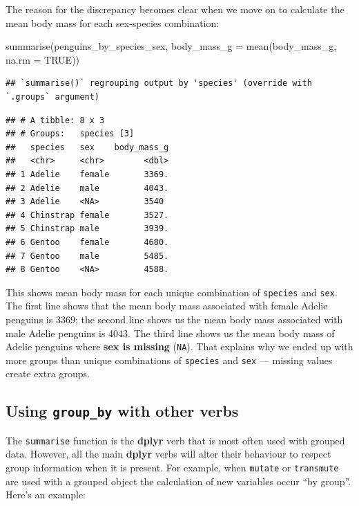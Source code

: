 \documentclass[
]{book}
\newenvironment{Shaded}{\begin{snugshade}}{\end{snugshade}}
\newcommand{\AttributeTok}[1]{\textcolor[rgb]{0.77,0.63,0.00}{#1}}
\newcommand{\ConstantTok}[1]{\textcolor[rgb]{0.00,0.00,0.00}{#1}}
\newcommand{\FunctionTok}[1]{\textcolor[rgb]{0.00,0.00,0.00}{#1}}
\newcommand{\NormalTok}[1]{#1}
\begin{document}
The reason for the discrepancy becomes clear when we move on to calculate the mean body mass for each sex-species combination:

\begin{Shaded}
\begin{Highlighting}[]
\FunctionTok{summarise}\NormalTok{(penguins\_by\_species\_sex, }
          \AttributeTok{body\_mass\_g =} \FunctionTok{mean}\NormalTok{(body\_mass\_g, }\AttributeTok{na.rm =} \ConstantTok{TRUE}\NormalTok{))}
\end{Highlighting}
\end{Shaded}

\begin{verbatim}
## `summarise()` regrouping output by 'species' (override with `.groups` argument)
\end{verbatim}

\begin{verbatim}
## # A tibble: 8 x 3
## # Groups:   species [3]
##   species   sex    body_mass_g
##   <chr>     <chr>        <dbl>
## 1 Adelie    female       3369.
## 2 Adelie    male         4043.
## 3 Adelie    <NA>         3540 
## 4 Chinstrap female       3527.
## 5 Chinstrap male         3939.
## 6 Gentoo    female       4680.
## 7 Gentoo    male         5485.
## 8 Gentoo    <NA>         4588.
\end{verbatim}

This shows mean body mass for each unique combination of \texttt{species} and \texttt{sex}. The first line shows that the mean body mass associated with female Adelie penguins is 3369; the second line shows us the mean body mass associated with male Adelie penguins is 4043. The third line shows us the mean body mass of Adelie penguins where \textbf{sex is missing} (\texttt{NA}). That explains why we ended up with more groups than unique combinations of \texttt{species} and \texttt{sex} --- missing values create extra groups.

\hypertarget{using-group_by-with-other-verbs}{%
\subsection{\texorpdfstring{Using \texttt{group\_by} with other verbs}{Using group\_by with other verbs}}\label{using-group_by-with-other-verbs}}

The \texttt{summarise} function is the \textbf{dplyr} verb that is most often used with grouped data. However, all the main \textbf{dplyr} verbs will alter their behaviour to respect group information when it is present. For example, when \texttt{mutate} or \texttt{transmute} are used with a grouped object the calculation of new variables occur ``by group''. Here's an example:
\end{document}
